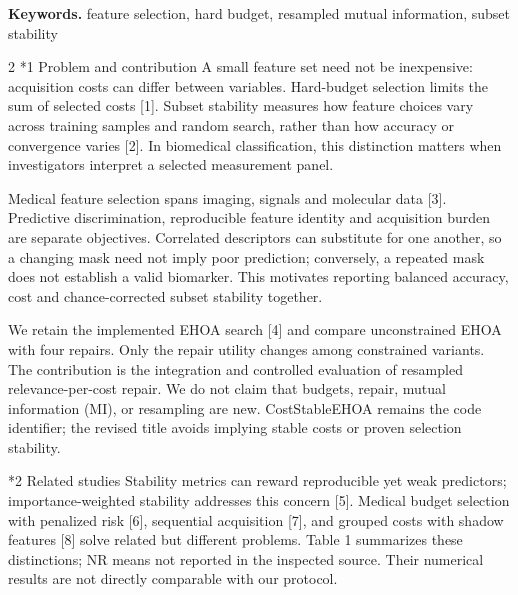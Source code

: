 \documentclass[10pt,a4paper]{article}
\makeatletter
\renewcommand{\section}{\@startsection{section}{1}{0pt}{5pt}{2pt}{\normalfont\normalsize\bfseries}}
\newcommand{\sect}[1]{\section*{#1}}
\makeatother
\begin{document}
\textbf{Keywords. } feature selection, hard budget, resampled mutual information, subset stability
\begin{multicols}{2}\raggedcolumns
\sect{1  Problem and contribution}
A small feature set need not be inexpensive: acquisition costs can differ between variables. Hard-budget selection limits the sum of selected costs [1]. Subset stability measures how feature choices vary across training samples and random search, rather than how accuracy or convergence varies [2]. In biomedical classification, this distinction matters when investigators interpret a selected measurement panel.

Medical feature selection spans imaging, signals and molecular data [3]. Predictive discrimination, reproducible feature identity and acquisition burden are separate objectives. Correlated descriptors can substitute for one another, so a changing mask need not imply poor prediction; conversely, a repeated mask does not establish a valid biomarker. This motivates reporting balanced accuracy, cost and chance-corrected subset stability together.

We retain the implemented EHOA search [4] and compare unconstrained EHOA with four repairs. Only the repair utility changes among constrained variants. The contribution is the integration and controlled evaluation of resampled relevance-per-cost repair. We do not claim that budgets, repair, mutual information (MI), or resampling are new. CostStableEHOA remains the code identifier; the revised title avoids implying stable costs or proven selection stability.

\sect{2  Related studies}
Stability metrics can reward reproducible yet weak predictors; importance-weighted stability addresses this concern [5]. Medical budget selection with penalized risk [6], sequential acquisition [7], and grouped costs with shadow features [8] solve related but different problems. Table 1 summarizes these distinctions; NR means not reported in the inspected source. Their numerical results are not directly comparable with our protocol.


\end{multicols}
\end{document}
